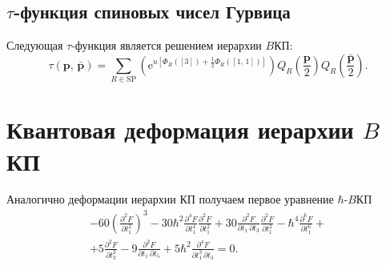 \documentclass[a4paper, 14pt]{extarticle}
\begin{document}
\subsection{$\tau$-функция спиновых чисел Гурвица}
Следующая $\tau$-функция является решением иерархии $B$КП:
\begin{equation}
	\tau \left( \mathbf{p},\,\bar{\mathbf{p}} \right) =
	\sum_{R \in \mathrm{SP}}^{} \left( \mathrm{e} ^{u \left[ 
	\Phi_R\left( \left[ 3 \right]  \right) +\frac{1}{2}\Phi_R \left( \left[ 1,\,1 \right]  \right) \right] } \right) Q_R\left(\frac{\mathbf{p}}{2}\right)Q_R \left(\frac{\bar{\mathbf{p}}}{2}\right)
	\label{}
.\end{equation}
\section{Квантовая деформация иерархии $B$КП}
Аналогично деформации иерархии КП получаем первое уравнение $\hbar $-$B$КП
\begin{multline}
-60 \left(\frac{\partial ^2F}{\partial
   t_1^2}\right)^3-30\hbar ^2 \frac{\partial ^4F}{\partial
   t_1^4} \frac{\partial ^2F}{\partial
   t_1^2}+30 \frac{\partial ^2F}{\partial t_1\, \partial t_3}
   \frac{\partial ^2F}{\partial t_1^2}-\hbar ^4\frac{\partial
   ^6F}{\partial t_1^6}+\\+5 \frac{\partial ^2F}{\partial
   t_3^2}-9 \frac{\partial ^2F}{\partial t_1\, \partial t_5}+5
   \hbar ^2\frac{\partial ^4F}{\partial t_1^3\, \partial t_3}=0	
	\label{}
.\end{multline}
\end{document}
